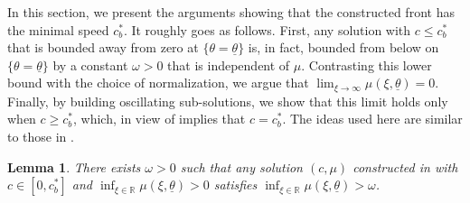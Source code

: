 \documentclass[11pt]{article}    %
\newtheorem{lemma}[theorem]{Lemma}
\newcommand{\R}{\mathbb{R}}
\begin{document}
In this section, we present the arguments showing that the constructed front has the minimal speed $c_b^*$. It roughly goes as follows.  First, any solution with $c \leq c^*_b$ that is bounded away from zero at $\{\theta = \underline\theta\}$ is, in fact, bounded from below on $\{\theta=\underline\theta\}$ by a constant $\omega>0$ that is independent of $\mu$.  Contrasting this lower bound with the choice of normalization, we argue that $\lim_{\xi\to \infty} \mu(\xi,\underline\theta) = 0$.  Finally, by building oscillating sub-solutions, we show that this limit holds only when $c \geq c^*_b$, which, in view of  implies that $c = c^*_b$. The ideas used here are similar to those in \cite{AlfaroCovilleRaoul,BouinCalvez}.





\begin{lemma}\label{lem:inf}
There exists $\omega > 0$ such that any solution $(c,\mu)$ constructed in 
with $c \in \left[ 0 , c_b^*\right]$ and $\inf_{\xi \in \R} \mu(\xi,\underline\theta)  > 0$ satisfies $\inf_{\xi \in \R} \mu(\xi,\underline\theta) > \omega$.
\end{lemma}
\end{document}
